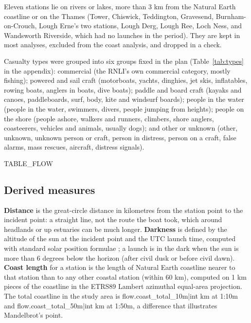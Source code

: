 \documentclass[11pt,a4paper]{article}
\begin{document}
Eleven stations lie on rivers or lakes, more than 3 km from the Natural Earth coastline or on the Thames (Tower, Chiswick, Teddington, Gravesend, Burnham-on-Crouch, Lough Erne's two stations, Lough Derg, Lough Ree, Loch Ness, and Wandsworth Riverside, which had no launches in the period). They are kept in most analyses, excluded from the coast analysis, and dropped in a check.

Casualty types were grouped into six groups fixed in the plan (Table~\ref{tab:types} in the appendix): commercial (the RNLI's own commercial category, mostly fishing); powered and sail craft (motorboats, yachts, dinghies, jet skis, inflatables, rowing boats, anglers in boats, dive boats); paddle and board craft (kayaks and canoes, paddleboards, surf, body, kite and windsurf boards); people in the water (people in the water, swimmers, divers, people jumping from heights); people on the shore (people ashore, walkers and runners, climbers, shore anglers, coasteerers, vehicles and animals, usually dogs); and other or unknown (other, unknown, unknown person or craft, person in distress, person on a craft, false alarms, mass rescues, aircraft, distress signals).

{{TABLE_FLOW}}

\subsection{Derived measures}
\textbf{Distance} is the great-circle distance in kilometres from the station point to the incident point: a straight line, not the route the boat took, which around headlands or up estuaries can be much longer. \textbf{Darkness} is defined by the altitude of the sun at the incident point and the UTC launch time, computed with standard solar position formulae \citep{meeus1998}; a launch is in the dark when the sun is more than 6 degrees below the horizon (after civil dusk or before civil dawn). \textbf{Coast length} for a station is the length of Natural Earth coastline nearer to that station than to any other coastal station (within 60 km), computed on 1 km pieces of the coastline in the ETRS89 Lambert azimuthal equal-area projection. The total coastline in the study area is {{flow.coast_total_10m|int}} km at 1:10m and {{flow.coast_total_50m|int}} km at 1:50m, a difference that illustrates Mandelbrot's point.
\end{document}

